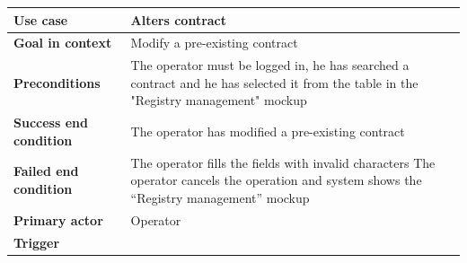 {{{			\clearpage

			\begin{table}[h]
			\begin{tabular}{|p{4cm}|p{10cm}|}
			\hline
				\centering \vspace{1mm} \bfseries{Use case} \vspace{1mm} & 
				\vspace{1mm} Alters contract \vspace{1mm}\\
			\hline
				\centering \vspace{1mm} \bfseries{Goal in context} \vspace{1mm} & 
				\vspace{1mm} Modify a pre-existing contract \vspace{1mm}\\
			\hline
				\centering \vspace{1mm} \bfseries{Preconditions} \vspace{1mm} & 
				\vspace{1mm} The operator must be logged in, he has searched a contract and he has selected it from the table in the "Registry management"  mockup \vspace{1mm}\\
			\hline
				\centering \vspace{1mm} \bfseries{Success end condition} \vspace{1mm} & 
				\vspace{1mm} The operator has modified a pre-existing contract \vspace{1mm}\\
			\hline
				\centering \vspace{1mm} \bfseries{Failed end condition} \vspace{1mm} & 
				\vspace{1mm} The operator fills the fields with invalid characters The operator cancels the operation and system shows the “Registry management” mockup \vspace{1mm}\\
			\hline
				\centering \vspace{1mm} \bfseries{Primary actor} \vspace{1mm} & 
				\vspace{1mm} Operator \vspace{1mm}\\
			\hline
				\centering \vspace{1mm} \bfseries{Trigger} \vspace{1mm} & 

\end{tabular}
\end{table}}}}
